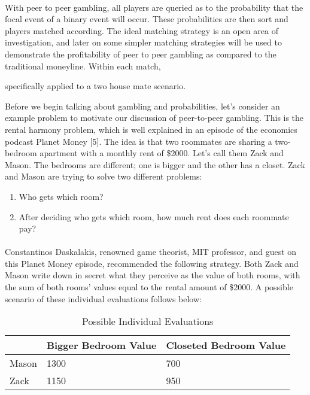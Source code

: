 \documentclass[12pt,letterpaper]{article}
\begin{document}
\paragraph{} With peer to peer gambling, all players are queried as to the probability that the focal event of a binary event will occur. These probabilities are then sort and players matched according. The ideal matching strategy is an open area of investigation, and later on some simpler matching strategies will be used to demonstrate the profitability of peer to peer gambling as compared to the traditional moneyline. Within each match, %




 specifically applied to a two house mate scenario. 



 Before we begin talking about gambling and probabilities, let’s consider an example problem to motivate our discussion of peer-to-peer gambling. This is the rental harmony problem, which is well explained in an episode of the economics podcast Planet Money [5]. The idea is that two roommates are sharing a two-bedroom apartment with a monthly rent of \$2000. Let’s call them Zack and Mason. The bedrooms are different; one is bigger and the other has a closet. Zack and Mason are trying to solve two different problems:\\

\begin{enumerate}
\item Who gets which room?

\item After deciding who gets which room, how much rent does each roommate pay?
\end{enumerate}

\paragraph{} Constantinos Daskalakis, renowned game theorist, MIT professor, and guest on this Planet Money episode, recommended the following strategy. Both Zack and Mason write down in secret what they perceive as the value of both rooms, with the sum of both rooms’ values equal to the rental amount of \$2000. A possible scenario of these individual evaluations follows below:

\begin{center}
	\begin{table}[h]
	\begin{tabular}{ | C{4.6cm} | C{4.6cm} | C{4.6cm} |}
	\hline
	& Bigger Bedroom Value & Closeted Bedroom Value \\ 
	\hline
	Mason & 1300 & 700 \\  
	\hline
	Zack & 1150 & 950  \\ 
	\hline
	\end{tabular}
	\caption{\label{demo-table}Possible Individual Evaluations}
	\end{table}
\end{center}
\vspace{-25pt}
\end{document}
